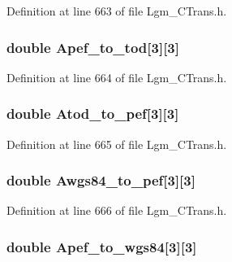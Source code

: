 Definition at line 663 of file Lgm\_\-CTrans.h.\hypertarget{struct_lgm___c_trans_82510707db95aee065a6a529b22f4792}{
\subsubsection[{Apef\_\-to\_\-tod}]{\setlength{\rightskip}{0pt plus 5cm}double {\bf Apef\_\-to\_\-tod}\mbox{[}3\mbox{]}\mbox{[}3\mbox{]}}}
\label{struct_lgm___c_trans_82510707db95aee065a6a529b22f4792}




Definition at line 664 of file Lgm\_\-CTrans.h.\hypertarget{struct_lgm___c_trans_1104a01831f9fe60ee88ddc9d7b5c15d}{
\subsubsection[{Atod\_\-to\_\-pef}]{\setlength{\rightskip}{0pt plus 5cm}double {\bf Atod\_\-to\_\-pef}\mbox{[}3\mbox{]}\mbox{[}3\mbox{]}}}
\label{struct_lgm___c_trans_1104a01831f9fe60ee88ddc9d7b5c15d}




Definition at line 665 of file Lgm\_\-CTrans.h.\hypertarget{struct_lgm___c_trans_5e570327e8c4ba164727c5831cdda367}{
\subsubsection[{Awgs84\_\-to\_\-pef}]{\setlength{\rightskip}{0pt plus 5cm}double {\bf Awgs84\_\-to\_\-pef}\mbox{[}3\mbox{]}\mbox{[}3\mbox{]}}}
\label{struct_lgm___c_trans_5e570327e8c4ba164727c5831cdda367}




Definition at line 666 of file Lgm\_\-CTrans.h.\hypertarget{struct_lgm___c_trans_de0af2bce4c3134f0b09cc1a13b74733}{
\subsubsection[{Apef\_\-to\_\-wgs84}]{\setlength{\rightskip}{0pt plus 5cm}double {\bf Apef\_\-to\_\-wgs84}\mbox{[}3\mbox{]}\mbox{[}3\mbox{]}}}
\label{struct_lgm___c_trans_de0af2bce4c3134f0b09cc1a13b74733}




